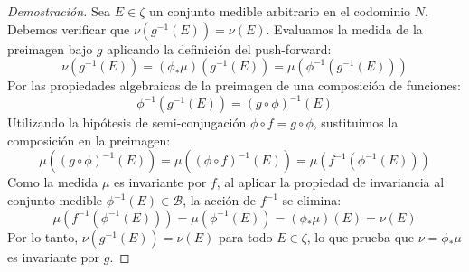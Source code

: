\begin{proof}[Demostración]
	Sea $E \in \zeta$ un conjunto medible arbitrario en el codominio $N$. Debemos verificar que $\nu(g^{-1}(E)) = \nu(E)$. Evaluamos la medida de la preimagen bajo $g$ aplicando la definición del push-forward:
	$$ \nu(g^{-1}(E)) = (\phi_* \mu)(g^{-1}(E)) = \mu\left( \phi^{-1}(g^{-1}(E)) \right) $$
	Por las propiedades algebraicas de la preimagen de una composición de funciones:
	$$ \phi^{-1}(g^{-1}(E)) = (g \circ \phi)^{-1}(E) $$
	Utilizando la hipótesis de semi-conjugación $\phi \circ f = g \circ \phi$, sustituimos la composición en la preimagen:
	$$ \mu\left( (g \circ \phi)^{-1}(E) \right) = \mu\left( (\phi \circ f)^{-1}(E) \right) = \mu\left( f^{-1}(\phi^{-1}(E)) \right) $$
	Como la medida $\mu$ es invariante por $f$, al aplicar la propiedad de invariancia al conjunto medible $\phi^{-1}(E) \in \mathcal{B}$, la acción de $f^{-1}$ se elimina:
	$$ \mu\left( f^{-1}(\phi^{-1}(E)) \right) = \mu(\phi^{-1}(E)) = (\phi_* \mu)(E) = \nu(E) $$
	Por lo tanto, $\nu(g^{-1}(E)) = \nu(E)$ para todo $E \in \zeta$, lo que prueba que $\nu = \phi_* \mu$ es invariante por $g$.
\end{proof}

